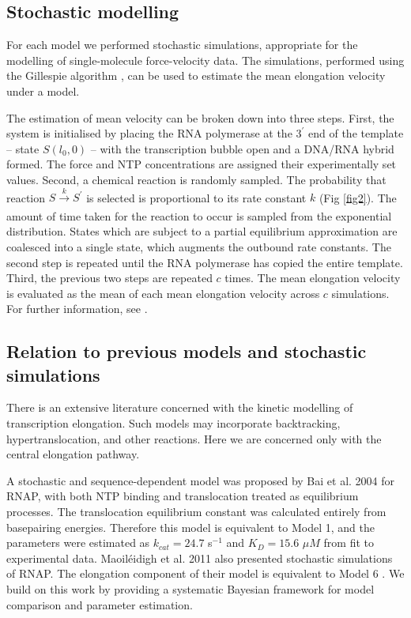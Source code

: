 \documentclass[10pt,letterpaper]{article}
\begin{document}
\subsection*{Stochastic modelling}


For each model we performed stochastic simulations, appropriate for the modelling of single-molecule force-velocity data. The simulations, performed using the Gillespie algorithm \cite{gillespie1977exact, lecca2013stochastic}, can be used to estimate the mean elongation velocity under a model.



The estimation of mean velocity can be broken down into three steps. First, the system is initialised by placing the RNA polymerase at the $3^\prime$ end of the template -- state $S(l_0, 0)$ -- with the transcription bubble open and a DNA/RNA hybrid formed. The force and NTP concentrations are assigned their experimentally set values. Second, a chemical reaction is randomly sampled. The probability that reaction $S \xrightarrow[]{k} S^\prime$ is selected is proportional to its rate constant $k$ (Fig \ref{fig2}).  The amount of time taken for the reaction to occur is sampled from the exponential distribution. States which are subject to a partial equilibrium approximation are coalesced into a single state, which augments the outbound rate constants. The second step is repeated until the RNA polymerase has copied the entire template. Third, the previous two steps are repeated $c$ times. The mean elongation velocity is evaluated as the mean of each mean elongation velocity across $c$ simulations. For further information, see .\\






\subsection*{Relation to previous models and stochastic simulations}




There is an extensive literature concerned with the kinetic modelling of transcription elongation. Such models may incorporate backtracking, hypertranslocation, and other reactions. Here we are concerned only with the central elongation pathway.


A stochastic and sequence-dependent model  was proposed by Bai et al. 2004 \cite{bai2004sequence} for RNAP, with both NTP binding and translocation treated as equilibrium processes. The translocation equilibrium constant was calculated entirely from basepairing energies. Therefore this model is equivalent to Model 1, and the parameters were estimated as $k_{cat} = 24.7$ s$^{-1}$ and $K_D = 15.6$ $\mu M$ from fit to experimental data. Maoil{\'e}idigh et al. 2011 also presented stochastic simulations of RNAP. The elongation component of their model is equivalent to Model 6 \cite{maoileidigh2011unified}. We build on this work by providing a systematic Bayesian framework for model comparison and parameter estimation.   \par
\end{document}
